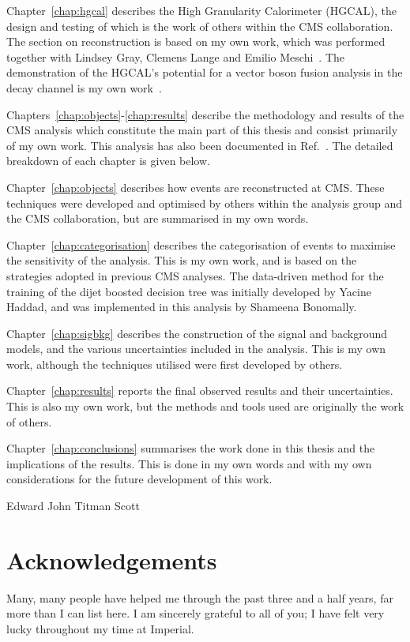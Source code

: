 Chapter~\ref{chap:hgcal} describes the High Granularity Calorimeter (HGCAL), 
the design and testing of which is the work of others within the CMS collaboration. 
The section on reconstruction is based on my own work, 
which was performed together with Lindsey Gray, Clemens Lange and Emilio Meschi~\cite{ClusteringConf}.
The demonstration of the HGCAL's potential for a vector boson fusion analysis 
in the \Hgg decay channel is my own work~\cite{HGCAL}.

Chapters~\ref{chap:objects}-\ref{chap:results} describe the methodology and results of the CMS \Hgg analysis
which constitute the main part of this thesis and consist primarily of my own work.
This analysis has also been documented in Ref.~\cite{HIG-18-029}.
The detailed breakdown of each chapter is given below.

Chapter~\ref{chap:objects} describes how events are reconstructed at CMS.
These techniques were developed and optimised by others within the \Hgg analysis group 
and the CMS collaboration, but are summarised in my own words.

Chapter~\ref{chap:categorisation} describes the categorisation of events 
to maximise the sensitivity of the analysis.
This is my own work, and is based on the strategies adopted in previous CMS \Hgg analyses.
The data-driven method for the training of the dijet boosted decision tree 
was initially developed by Yacine Haddad, and was implemented in this analysis by Shameena Bonomally.

Chapter~\ref{chap:sigbkg} describes the construction of the signal and background models, 
and the various uncertainties included in the analysis.
This is my own work, although the techniques utilised were first developed by others.

Chapter~\ref{chap:results} reports the final observed results and their uncertainties.
This is also my own work, but the methods and tools used are originally the work of others.

Chapter~\ref{chap:conclusions} summarises the work done in this thesis 
and the implications of the results.
This is done in my own words and with my own considerations for the future development of this work.

\begin{flushright}
    Edward John Titman Scott
\end{flushright}


\chapter*{\centering Acknowledgements}
Many, many people have helped me through the past three and a half years, 
far more than I can list here.
I am sincerely grateful to all of you; I have felt very lucky throughout my time at Imperial.

